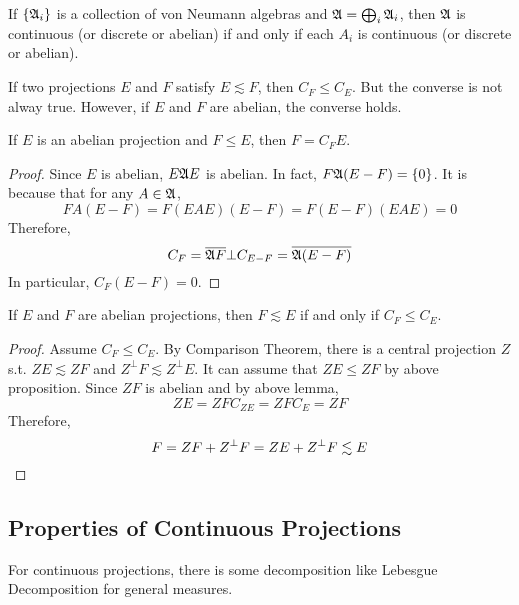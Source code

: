 \begin{cor}
	If $\{\mathfrak{A}_i\}$ is a collection of von Neumann algebras and $\mathfrak{A} = \bigoplus_i \mathfrak{A}_i$, then $\mathfrak{A}$ is continuous (or discrete or abelian) if and only if each $A_i$ is continuous (or discrete or abelian).
\end{cor}

If two projections $E$ and $F$ satisfy $E \lesssim F$, then $C_F \leqslant C_E$. But the converse is not alway true. However, if $E$ and $F$ are abelian, the converse holds.

\begin{lem}
	If $E$ is an abelian projection and $F \leqslant E$, then $F = C_F E$.
\end{lem}
\begin{proof}
	Since $E$ is abelian, $E \mathfrak{A} E$ is abelian. In fact, $F \mathfrak{A} (E-F) = \{0\}$. It is because that for any $A \in \mathfrak{A}$,
	\begin{equation*}
		FA(E-F) = F(EAE)(E - F) = F(E - F)(EAE) = 0
	\end{equation*}
	Therefore, 
	\begin{equation*}
		C_F = \overline{\mathfrak{A} F} \bot C_{E-F} = \overline{\mathfrak{A} (E - F)}
	\end{equation*}
	In particular, $C_F(E-F) = 0$.
\end{proof}

\begin{prop}
	If $E$ and $F$ are abelian projections, then $F \lesssim E$ if and only if $C_F \leqslant C_E$.
\end{prop}
\begin{proof}
	Assume $C_F \leqslant C_E$. By Comparison Theorem, there is a central projection $Z$ s.t. $ZE \lesssim ZF$ and  $Z^{\bot}F \lesssim Z^{\bot}E$. It can assume that $ZE \leqslant ZF$ by above proposition. Since $ZF$ is abelian and by above lemma,
	\begin{equation*}
		ZE = ZF C_{ZE} = ZF C_E = ZF
	\end{equation*}
	Therefore,
	\begin{equation*}
		F = ZF + Z^{\bot}F = ZE + Z^{\bot}F \lesssim E  \qedhere
	\end{equation*}
\end{proof}

\subsection{Properties of Continuous Projections}

For continuous projections, there is some decomposition like Lebesgue Decomposition for general measures.

